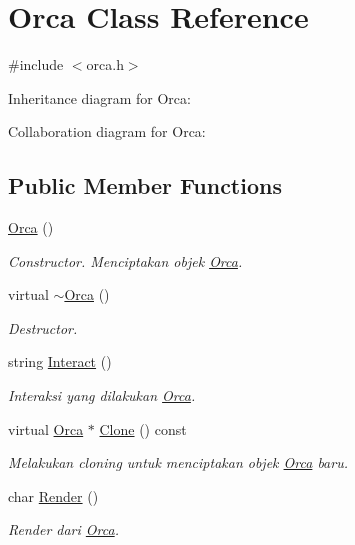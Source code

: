 \hypertarget{classOrca}{}\section{Orca Class Reference}
\label{classOrca}


{\ttfamily \#include $<$orca.\+h$>$}



Inheritance diagram for Orca\+:


Collaboration diagram for Orca\+:
\subsection*{Public Member Functions}
\begin{DoxyCompactItemize}
\item 
\hyperlink{classOrca_a1efb2589b67f95863f7c8a653cfb13f3}{Orca} ()
\begin{DoxyCompactList}\small\item\em Constructor. Menciptakan objek \hyperlink{classOrca}{Orca}. \end{DoxyCompactList}\item 
virtual \hyperlink{classOrca_a964d6cd8b816cfa70f5194457b9382c0}{$\sim$\+Orca} ()
\begin{DoxyCompactList}\small\item\em Destructor. \end{DoxyCompactList}\item 
string \hyperlink{classOrca_adf95ca04578ac04aaa717ef2dd11bf4c}{Interact} ()
\begin{DoxyCompactList}\small\item\em Interaksi yang dilakukan \hyperlink{classOrca}{Orca}. \end{DoxyCompactList}\item 
virtual \hyperlink{classOrca}{Orca} $\ast$ \hyperlink{classOrca_ac44eb30486ba4051eefa914dc8cd670f}{Clone} () const 
\begin{DoxyCompactList}\small\item\em Melakukan cloning untuk menciptakan objek \hyperlink{classOrca}{Orca} baru. \end{DoxyCompactList}\item 
char \hyperlink{classOrca_a0673bfc8e70af67b463a4fcae224d9d5}{Render} ()
\begin{DoxyCompactList}\small\item\em Render dari \hyperlink{classOrca}{Orca}. \end{DoxyCompactList}\end{DoxyCompactItemize}
